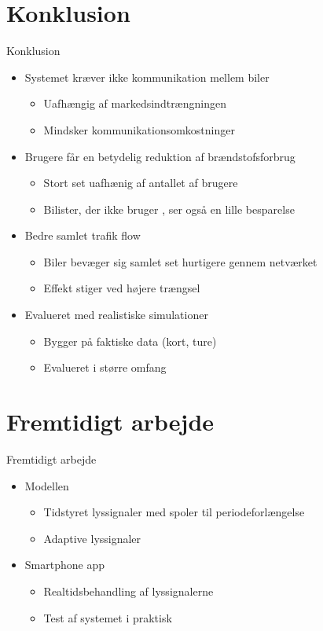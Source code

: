 \section{Konklusion}

\begin{frame}{Konklusion}
\begin{itemize}
\item Systemet kræver ikke kommunikation mellem biler
	\begin{itemize}
		\item Uafhængig af markedsindtrængningen
		\item Mindsker kommunikationsomkostninger
	\end{itemize}
\item Brugere får en betydelig reduktion af brændstofsforbrug
	\begin{itemize}
		\item Stort set uafhænig af antallet af brugere
		\item Bilister, der ikke bruger \tech, ser også en lille besparelse
	\end{itemize}
\item Bedre samlet trafik flow
	\begin{itemize}
		\item Biler bevæger sig samlet set hurtigere gennem netværket
		\item Effekt stiger ved højere trængsel
	\end{itemize}
\item Evalueret med realistiske simulationer
	\begin{itemize}
		\item Bygger på faktiske data (kort, ture)
		\item Evalueret i større omfang
	\end{itemize}
\end{itemize}
\end{frame}

\section{Fremtidigt arbejde}

\begin{frame}{Fremtidigt arbejde}

\begin{itemize}
	\item Modellen
	\begin{itemize}
		\item Tidstyret lyssignaler med spoler til periodeforlængelse
		\item Adaptive lyssignaler
	\end{itemize}
	\item Smartphone app
	\begin{itemize}
		\item Realtidsbehandling af lyssignalerne
		\item Test af systemet i praktisk
	\end{itemize}
	
\end{itemize}
\end{frame}





